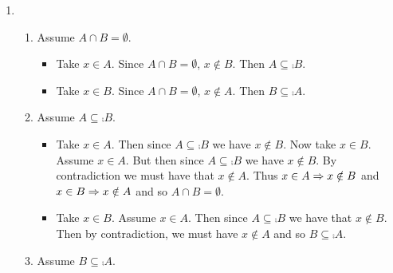 \documentclass[12pt]{book}
\begin{document}
{\begin{enumerate}
\begin{enumerate}
\begin{itemize}
		\item Take $x \in A$. Then $x \in A \cup B = B$. Since $x \in A$ and $x \in B$ then $x \in A \cap B$ and so $A \subseteq A \cap B$. But since $A \cap B \subseteq A$ we have $A \cap B = A$.
		\end{itemize}
		\item Assume $A \cap B = A$.
		\begin{itemize}
		\item Take $x \in A$. Then $x \in A \cap B$ and so $x \in B$. Therefore $A \subseteq B$.
		\item Take $x \notin B$. Then $x \notin A \cap B$ and so $x \notin A$. Therefore $\comp{A} \supseteq \comp{B}$.
		\item Take $x \in A \cup B$. Then $x \in A$ or $x \in B$. Assume $x \notin B$. Then $x \notin A \cap B = A$ and so $x \notin A \cup B$. By contradiction, we must have the $x \in B$. Then $A \cup B \subseteq B$. But since $B \subseteq A \cup B$ we have that $A \cup B = B$.
		\end{itemize}
		\end{enumerate}
\item \begin{enumerate}
		\item Assume $A \cap B = \emptyset$.
		\begin{itemize}
			\item Take $x \in A$. Since $A \cap B = \emptyset$, $x \notin B$. Then $A \subseteq \comp{B}$.
			\item Take $x \in B$. Since $A \cap B = \emptyset$, $x \notin A$. Then $B \subseteq \comp{A}$.
		\end{itemize}
		\item Assume $A \subseteq \comp{B}$.
		\begin{itemize}
			\item Take $x \in A$. Then since $A \subseteq \comp{B}$ we have $x \notin B$. Now take $x \in B$. Assume $x \in A$. But then since $A \subseteq \comp{B}$ we have $x \notin B$. By contradiction we must have that $x \notin A$. Thus $x \in A \Rightarrow x \notin B$ and $x \in B \Rightarrow x \notin A$ and so $A \cap B = \emptyset$.
			\item Take $x \in B$. Assume $x \in A$. Then since $A \subseteq \comp{B}$ we have that $x \notin B$. Then by contradiction, we must have $x \notin A$ and so $B \subseteq \comp{A}$.
		\end{itemize}
		\item Assume $B \subseteq \comp{A}$.
		\begin{itemize}

\end{itemize}
\end{enumerate}
\end{enumerate}}
\end{document}
